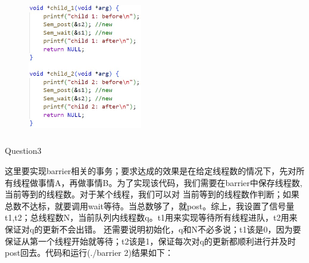 \documentclass[12pt]{article}
\begin{document}
\newpage
\begin{figure}[h]
    \centering
    \includegraphics[width=5cm,height=6cm]{hw9-5.jpg}
\end{figure}
\begin{large}
    \noindent Question3\par
\end{large}
这里要实现barrier相关的事务；要求达成的效果是在给定线程数的情况下，先对所有线程做事情A，再做事情B。为了实现该代码，我们需要在barrier中保存线程数,当前等到的线程数。对于某个线程，我们可以对
当前等到的线程数作判断；如果总数不达标，就要调用wait等待。当总数够了，就post。综上，我设置了信号量t1,t2；总线程数N，当前队列内线程数q。t1用来实现等待所有线程进队，t2用来保证对q的更新不会出错。
还需要说明初始化，q和N不必多说；t1该是0，因为要保证从第一个线程开始就等待；t2该是1，保证每次对q的更新都顺利进行并及时post回去。代码和运行(./barrier 2)结果如下：
\begin{figure}[!h]
    \centering
    \hfill
\end{figure}
\end{document}
